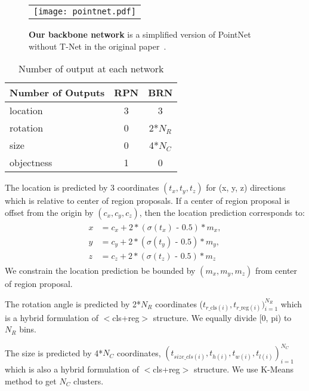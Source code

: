 \documentclass[letterpaper, 10 pt, conference]{ieeeconf}
\begin{document}
\begin{figure}[h]
    \centering
    \begin{tabular}{c}
    \texttt{[image: pointnet.pdf]}
    \end{tabular}
    \caption{\textbf{Our backbone network} is a simplified version of PointNet without T-Net in the original paper~\cite{qi_pointnet_2017}.}
    \label{fig:pointnet}
\end{figure}

\begin{table}[h]
\begin{center}
\begin{tabular}{@{}>{\centering}m{3.5cm}cc@{}}
\toprule
Number of Outputs & RPN & BRN\\
\midrule
location & 3 & 3\\
rotation  & 0 & 2*$N_{R}$\\
size & 0 & 4*$N_{C}$\\
objectness & 1 & 0\\
\bottomrule
\end{tabular}
\end{center}
\caption{Number of output at each network}
\label{tab:output_kazua3d}
\end{table}

The location is predicted by 3 coordinates $(t_{x}, t_{y}, t_{z})$ for (x, y, z) directions which is relative to center of region proposals. If a center of region proposal is offset from the origin by $(c_{x}, c_{y}, c_{z})$, then the location prediction corresponds to:
\begin{align}
\label{eqn:eqlabel}
\begin{split}
 x &= c_{x} + \text{2}* ( \sigma(t_{x}) \text{ - 0.5}) * m_{x} ,
\\
 y &= c_{y} + \text{2}* ( \sigma(t_{y}) \text{ - 0.5}) * m_{y} ,
\\
 z &= c_{z} + \text{2}* ( \sigma(t_{z}) \text{ - 0.5}) * m_{z}
\end{split}
\end{align}
We constrain the location prediction be bounded by $(m_{x}, m_{y}, m_{z})$ from center of region proposal.

The rotation angle is predicted by 2*$N_{R}$ coordinates ($t_{r\_\text{cls}(i)}, t_{r\_\text{reg}(i)})_{i=1}^{N_{R}}$ which is a hybrid formulation of $<$cls+reg$>$ structure. We equally divide [0, pi) to $N_{R}$ bins.

The size is predicted by 4*$N_{C}$ coordinates, $(t_{size\_cls(i)}, t_{h(i)}, t_{w(i)}, t_{l(i)})_{i=1}^{N_{C}}$ which is also a hybrid formulation of $<$cls+reg$>$ structure. We use K-Means method to get $N_{C}$ clusters.
\end{document}
